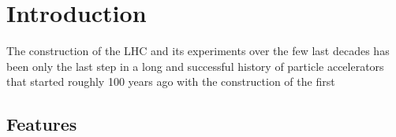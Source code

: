 \newcommand{\package}{\emph}

\chapter{Introduction}

The construction of the LHC and its experiments over the few last decades has been only
the last step in a long and successful history of particle accelerators that started roughly 100 years
ago with the construction of the first 



\section{Features}
\label{sec:features}




